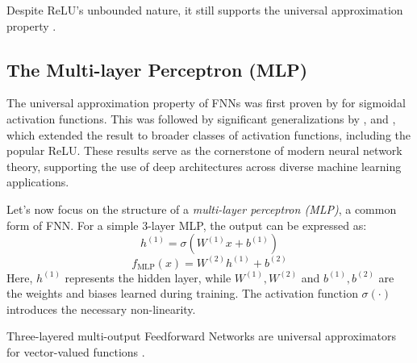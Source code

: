 \documentclass{article}
\theoremstyle{definition} \newtheorem{definition}{Definition}
\theoremstyle{remark} \newtheorem{remark}{Remark}
\newcounter{ct}
\begin{document}
Despite ReLU's unbounded nature, it still supports the universal approximation property \citep{yarotsky2017error}.

\citep{mhaskar2019function}

\subsection{The Multi-layer Perceptron (MLP)}
The universal approximation property of FNNs was first proven by \citep{cybenko1989approximation} for sigmoidal activation functions. This was followed by significant generalizations by \citep{hornik1989multilayer}, \citep{funahashi1989approximate} and \citep{hechtnielsen1992backpropagation}, which extended the result to broader classes of activation functions, including the popular ReLU.
These results serve as the cornerstone of modern neural network theory, supporting the use of deep architectures across diverse machine learning applications.



Let’s now focus on the structure of a \textit{multi-layer perceptron (MLP)}, a common form of FNN. For a simple 3-layer MLP, the output can be expressed as:
\[
h^{(1)} = \sigma(W^{(1)} x + b^{(1)})
\]
\[
f_{\text{MLP}}(x) = W^{(2)} h^{(1)} + b^{(2)}
\]
Here, \(h^{(1)}\) represents the hidden layer, while \(W^{(1)}, W^{(2)}\) and \(b^{(1)}, b^{(2)}\) are the weights and biases learned during training. The activation function \(\sigma(\cdot)\) introduces the necessary non-linearity.

Three-layered multi-output Feedforward Networks are universal approximators for vector-valued functions \citep{irie1988capabilities}.




\end{document}
